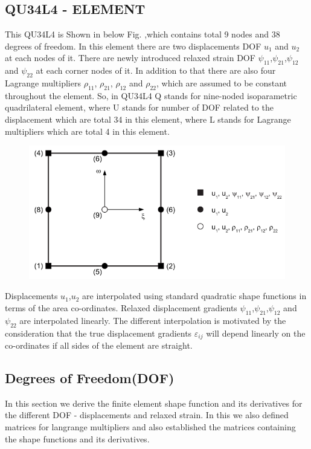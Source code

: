 \documentclass[12pt]{article}
\begin{document}
\subsection{QU34L4 - ELEMENT}
This QU34L4 is Shown in below Fig. ,which contains total 9 nodes and 38 degrees of freedom. In this element there are two displacements DOF $ u_1 $ and $ u_2  $ at each nodes of it. There are newly introduced relaxed strain DOF $ \psi_{11} $,$ \psi_{21} $,$ \psi_{12} $ and $ \psi_{22} $ at each corner nodes of it. In addition to that there are also four Lagrange multipliers $ \rho_{11} $,  $ \rho_{21} $, $ \rho_{12} $ and $ \rho_{22} $,  which are assumed to be constant throughout the element. So, in QU34L4 Q stands for nine-noded isoparametric quadrilateral element, where U stands for number of DOF related to the displacement which are total 34 in this element, where L stands for Lagrange multipliers which are total 4 in this element. 
\begin{figure}[H]
	\begin{center}
		\includegraphics[scale=0.7]{ele.png}
	\end{center}  
\end{figure}
Displacements $ u_1 $,$ u_2 $ are interpolated using standard quadratic shape functions in terms of the area co-ordinates. Relaxed displacement gradients $ \psi_{11} $,$ \psi_{21} $,$ \psi_{12} $ and $ \psi_{22} $ are interpolated linearly. The different interpolation is motivated by the consideration that the true displacement gradients $ \varepsilon_{ij} $ will depend linearly
on the co-ordinates if all sides of the element are straight.
\subsection{Degrees of Freedom(DOF)}
In this section we derive the finite element shape function and its derivatives for the different DOF - displacements and relaxed strain. In this we also defined matrices for langrange multipliers and also established the matrices containing the shape functions and its derivatives.
\end{document}

